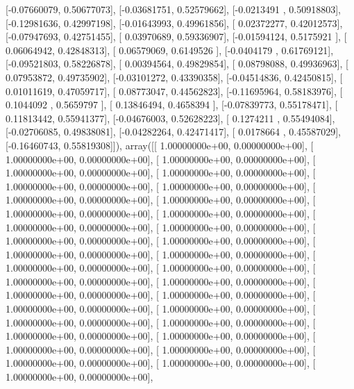 \documentclass{article}
\begin{document}
       [-0.07660079,  0.50677073],
       [-0.03681751,  0.52579662],
       [-0.0213491 ,  0.50918803],
       [-0.12981636,  0.42997198],
       [-0.01643993,  0.49961856],
       [ 0.02372277,  0.42012573],
       [-0.07947693,  0.42751455],
       [ 0.03970689,  0.59336907],
       [-0.01594124,  0.5175921 ],
       [ 0.06064942,  0.42848313],
       [ 0.06579069,  0.6149526 ],
       [-0.0404179 ,  0.61769121],
       [-0.09521803,  0.58226878],
       [ 0.00394564,  0.49829854],
       [ 0.08798088,  0.49936963],
       [ 0.07953872,  0.49735902],
       [-0.03101272,  0.43390358],
       [-0.04514836,  0.42450815],
       [ 0.01011619,  0.47059717],
       [ 0.08773047,  0.44562823],
       [-0.11695964,  0.58183976],
       [ 0.1044092 ,  0.5659797 ],
       [ 0.13846494,  0.4658394 ],
       [-0.07839773,  0.55178471],
       [ 0.11813442,  0.55941377],
       [-0.04676003,  0.52628223],
       [ 0.1274211 ,  0.55494084],
       [-0.02706085,  0.49838081],
       [-0.04282264,  0.42471417],
       [ 0.0178664 ,  0.45587029],
       [-0.16460743,  0.55819308]]), array([[  1.00000000e+00,   0.00000000e+00],
       [  1.00000000e+00,   0.00000000e+00],
       [  1.00000000e+00,   0.00000000e+00],
       [  1.00000000e+00,   0.00000000e+00],
       [  1.00000000e+00,   0.00000000e+00],
       [  1.00000000e+00,   0.00000000e+00],
       [  1.00000000e+00,   0.00000000e+00],
       [  1.00000000e+00,   0.00000000e+00],
       [  1.00000000e+00,   0.00000000e+00],
       [  1.00000000e+00,   0.00000000e+00],
       [  1.00000000e+00,   0.00000000e+00],
       [  1.00000000e+00,   0.00000000e+00],
       [  1.00000000e+00,   0.00000000e+00],
       [  1.00000000e+00,   0.00000000e+00],
       [  1.00000000e+00,   0.00000000e+00],
       [  1.00000000e+00,   0.00000000e+00],
       [  1.00000000e+00,   0.00000000e+00],
       [  1.00000000e+00,   0.00000000e+00],
       [  1.00000000e+00,   0.00000000e+00],
       [  1.00000000e+00,   0.00000000e+00],
       [  1.00000000e+00,   0.00000000e+00],
       [  1.00000000e+00,   0.00000000e+00],
       [  1.00000000e+00,   0.00000000e+00],
       [  1.00000000e+00,   0.00000000e+00],
       [  1.00000000e+00,   0.00000000e+00],
       [  1.00000000e+00,   0.00000000e+00],
       [  1.00000000e+00,   0.00000000e+00],
       [  1.00000000e+00,   0.00000000e+00],
       [  1.00000000e+00,   0.00000000e+00],
       [  1.00000000e+00,   0.00000000e+00],
       [  1.00000000e+00,   0.00000000e+00],
       [  1.00000000e+00,   0.00000000e+00],
       [  1.00000000e+00,   0.00000000e+00],
       [  1.00000000e+00,   0.00000000e+00],
\end{document}
